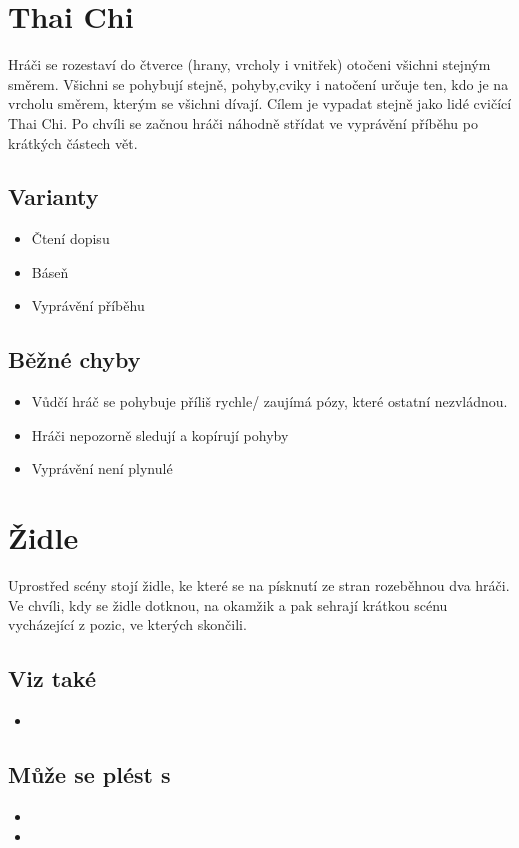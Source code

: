 \documentclass[main.tex]{subfiles}
\begin{document}
 
 
 
 
\needspace{5cm} \section{Thai Chi} \label{thai chi} Hráči se rozestaví do čtverce (hrany, vrcholy i vnitřek) otočeni všichni stejným směrem. 
Všichni se pohybují stejně, pohyby,cviky i natočení určuje ten, kdo je na vrcholu směrem, kterým se všichni dívají. 
Cílem je vypadat stejně jako lidé cvičící Thai Chi. 
Po chvíli se začnou hráči náhodně střídat ve vyprávění příběhu po krátkých částech vět. 
\subsection{Varianty} \begin{itemize}
\item Čtení dopisu
\item Báseň
\item Vyprávění příběhu
\end{itemize}
\subsection{Běžné chyby} \begin{itemize}
\item Vůdčí hráč se pohybuje příliš rychle/ zaujímá pózy, které ostatní nezvládnou.
\item Hráči nepozorně sledují a kopírují pohyby
\item Vyprávění není plynulé
\end{itemize}
  
\needspace{5cm} \section{Židle} \label{židle} Uprostřed scény stojí židle, ke které se na písknutí ze stran rozeběhnou dva hráči. Ve chvíli, kdy se židle dotknou, na okamžik  a pak sehrají krátkou scénu vycházející z pozic, ve kterých skončili. 
 
\subsection{ Viz také } \begin{itemize}
\item  {}
\end{itemize}
 
\subsection{ Může se plést s } \begin{itemize}
\item  {}
\item  {}
\end{itemize}
 
 
\end{document}
